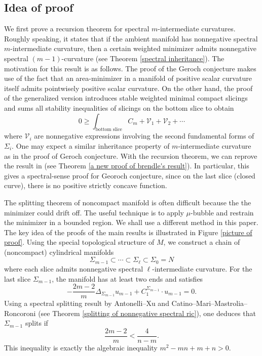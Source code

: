 \documentclass[11pt,letterpaper]{amsart}
\theoremstyle{definition}
\theoremstyle{remark}
\numberwithin{equation}{section}
\begin{document}
\subsection{Idea of proof}
 We first prove a recursion theorem for spectral $m$-intermediate curvatures. Roughly speaking, it states that if the ambient manifold has nonnegative spectral $m$-intermediate curvature, then a certain weighted minimizer admits nonnegative spectral $(m-1)$-curvature (see Theorem \ref{spectral inheritance}). The motivation for this result is as follows. The proof of the Geroch conjecture \cite{Schoen-Yau-PSC} makes use of the fact that an area-minimizer in a manifold of positive scalar curvature itself admits pointwisely positive scalar curvature. On the other hand, the proof of the generalized version \cite{brendlegeroch'sconjecture} introduces stable weighted minimal compact slicings and sums all stability inequalities of slicings on the bottom slice to obtain
\[
0 \geq \int_{\text{bottom slice}} C_m + \mathcal{V}_1 + \mathcal{V}_2 + \cdots
\]
where $\mathcal{V}_i$ are nonnegative expressions involving the second fundamental forms of $\Sigma_i$. One may expect a similar inheritance property of $m$-intermediate curvature as in the proof of Geroch conjecture.  With the recursion theorem, we can reprove the result in \cite{brendlegeroch'sconjecture} (see Theorem \ref{a new proof of brendle's result}). In particular, this gives a spectral-sense proof for Georoch conjecture, since on the last slice (closed curve), there is no positive strictly concave function.

The splitting theorem of noncompact manifold is often difficult because  the the minimizer could drift off. The useful technique is to apply $\mu$-bubble and restrain the minimizer in a bounded region. 
We shall use a different method in this paper. The key idea of the proofs of the main results is illustrated in Figure \ref{picture of proof}. Using the special topological structure of $M$, we construct a chain of (noncompact) cylindrical manifolds
\[
\Sigma_{m-1} \subset \cdots \subset \Sigma_{\ell} \subset \Sigma_0 = N
\]
where each slice admits nonnegative spectral $\ell$-intermediate curvature. For the last slice $\Sigma_{m-1}$, the manifold has at least two ends and satisfies
\[
-\frac{2m-2}{m} \Delta_{\Sigma_{m-1}} u_{m-1} + C_{1}^{\Sigma_{m-1}} \cdot u_{m-1} = 0.
\]
Using a spectral splitting result by Antonelli--Xu and Catino--Mari--Mastrolia--Roncoroni (see Theorem \ref{splitting of nonnegative spectral ric}), one deduces that $\Sigma_{m-1}$ splits if
\[
\frac{2m-2}{m} < \frac{4}{n-m}.
\]
This inequality is exactly the algebraic inequality $m^2 - mn + m + n > 0$.
\end{document}
